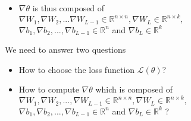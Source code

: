 \begin{frame}
\begin{overlayarea}{\textwidth}{\textheight}
\begin{itemize}
      \item<10-> $\nabla \theta$ is thus composed of \\
          $\nabla W_1, \nabla W_2, ... \nabla W_{L-1}\in \mathbb{R}^{n \times n}, \nabla W_{L} \in \mathbb{R}^{n \times k},$ \\
          $\nabla b_1, \nabla b_2, ..., \nabla b_{L-1} \in \mathbb{R}^n $ and $\nabla b_{L} \in \mathbb{R}^k$
    \end{itemize}
  \end{overlayarea}
\end{frame}

\begin{frame}
  \begin{block}{We need to answer two questions}
    \begin{itemize}
      \justifying
      \item<2-> How to choose the loss function $\mathscr{L}(\theta)$?
      \item<3-> How to compute $\nabla \theta$ which is composed of $\nabla W_1, \nabla W_2, ..., \nabla W_{L-1} \in \mathbb{R}^{n \times n}, \nabla W_L \in \mathbb{R}^{n \times k},$ \\ $\nabla b_1, \nabla b_2, ..., \nabla b_{L-1} \in \mathbb{R}^n $ and $\nabla b_L \in \mathbb{R}^k$ ?
    \end{itemize}
  \end{block}
\end{frame}

